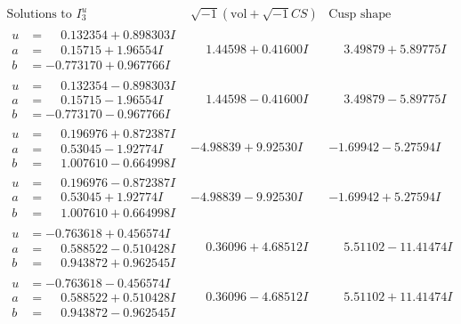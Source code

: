 \documentclass[1p]{elsarticle_modified}
\theoremstyle{definition}
\newcommand{\I}{\sqrt{-1}}
\begin{document}
$$\begin{array}{c|c|c}  
\text{Solutions to }I^u_{3}& \I (\text{vol} + \sqrt{-1}CS) & \text{Cusp shape}\\
 \hline 
\begin{aligned}
u &= \phantom{-}0.132354 + 0.898303 I \\
a &= \phantom{-}0.15715 + 1.96554 I \\
b &= -0.773170 + 0.967766 I\end{aligned}
 & \phantom{-}1.44598 + 0.41600 I & \phantom{-}3.49879 + 5.89775 I \\ \hline\begin{aligned}
u &= \phantom{-}0.132354 - 0.898303 I \\
a &= \phantom{-}0.15715 - 1.96554 I \\
b &= -0.773170 - 0.967766 I\end{aligned}
 & \phantom{-}1.44598 - 0.41600 I & \phantom{-}3.49879 - 5.89775 I \\ \hline\begin{aligned}
u &= \phantom{-}0.196976 + 0.872387 I \\
a &= \phantom{-}0.53045 - 1.92774 I \\
b &= \phantom{-}1.007610 - 0.664998 I\end{aligned}
 & -4.98839 + 9.92530 I & -1.69942 - 5.27594 I \\ \hline\begin{aligned}
u &= \phantom{-}0.196976 - 0.872387 I \\
a &= \phantom{-}0.53045 + 1.92774 I \\
b &= \phantom{-}1.007610 + 0.664998 I\end{aligned}
 & -4.98839 - 9.92530 I & -1.69942 + 5.27594 I \\ \hline\begin{aligned}
u &= -0.763618 + 0.456574 I \\
a &= \phantom{-}0.588522 - 0.510428 I \\
b &= \phantom{-}0.943872 + 0.962545 I\end{aligned}
 & \phantom{-}0.36096 + 4.68512 I & \phantom{-}5.51102 - 11.41474 I \\ \hline\begin{aligned}
u &= -0.763618 - 0.456574 I \\
a &= \phantom{-}0.588522 + 0.510428 I \\
b &= \phantom{-}0.943872 - 0.962545 I\end{aligned}
 & \phantom{-}0.36096 - 4.68512 I & \phantom{-}5.51102 + 11.41474 I \\ \hline\begin{aligned}

\end{aligned}
\end{array}$$
\end{document}
